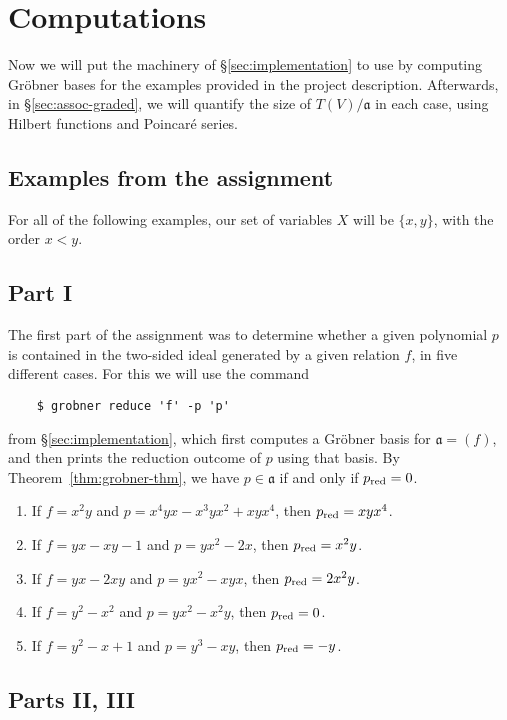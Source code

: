 \section{Computations}\label{sec:examples}
Now we will put the machinery of \S\ref{sec:implementation} to use by computing Gr\"obner bases for the examples provided in the project description. Afterwards, in \S\ref{sec:assoc-graded}, we will quantify the size of $T(V)/\mathfrak{a}$ in each case, using Hilbert functions and Poincar\'e series.

\subsection{Examples from the assignment}\label{sec:assignment-examples}
For all of the following examples, our set of variables $X$ will be $\{x,y\}$, with the order $x < y$.
\subsection*{Part I}

The first part of the assignment was to determine whether a given polynomial $p$ is contained in the two-sided ideal generated by a given relation $f$, in five different cases. For this we will use the command
\begin{verbatim}
	$ grobner reduce 'f' -p 'p'
\end{verbatim}
from \S\ref{sec:implementation}, which first computes a Gr\"obner basis for $\mathfrak{a} = (f)$, and then prints the reduction outcome of $p$ using that basis. By Theorem~\ref{thm:grobner-thm}, we have $p\in\mathfrak{a}$ if and only if $p_{\mathrm{red}}=0$.

\begin{enumerate}
	\item If $f = x^2y$ and $p = x^4 y x - x^3 y x^2 + xyx^4$, then $p_{\mathrm{red}} = xyx^4$.
	\item If $f = yx - xy - 1$ and $p = yx^2 - 2x$, then $p_{\mathrm{red}} = x^2 y$.
    \item If $f = yx - 2xy$ and $p = yx^2 - xyx$, then $p_{\mathrm{red}} = 2x^2y$.
    \item If $f = y^2 - x^2$ and $p = yx^2 - x^2y$, then $p_{\mathrm{red}} = 0$.
    \item If $f = y^2 - x + 1$ and $p=y^3 - xy$, then $p_{\mathrm{red}} = - y$.
\end{enumerate}

\subsection*{Parts II, III}

